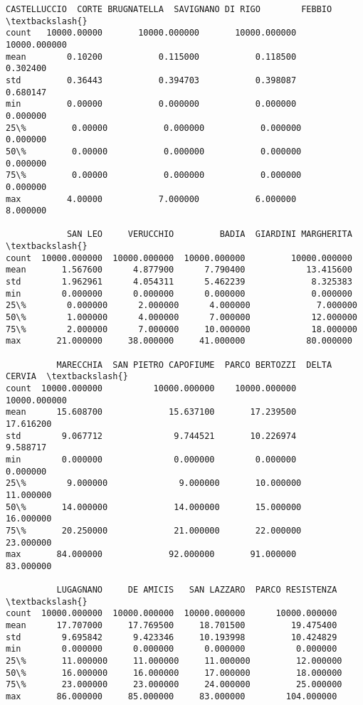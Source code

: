 \documentclass[11pt]{article}
\makeatletter
\newcommand{\boxspacing}{\kern\kvtcb@left@rule\kern\kvtcb@boxsep}
\newcommand{\prompt}[4]{
        {\ttfamily\llap{{\color{#2}[#3]:\hspace{3pt}#4}}\vspace{-\baselineskip}}
    }
\makeatother
\begin{document}
            \begin{tcolorbox}[breakable, size=fbox, boxrule=.5pt, pad at break*=1mm, opacityfill=0]
\prompt{Out}{outcolor}{22}{\boxspacing}
\begin{Verbatim}[commandchars=\\\{\}]
       CASTELLUCCIO  CORTE BRUGNATELLA  SAVIGNANO DI RIGO        FEBBIO  \textbackslash{}
count   10000.00000       10000.000000       10000.000000  10000.000000
mean        0.10200           0.115000           0.118500      0.302400
std         0.36443           0.394703           0.398087      0.680147
min         0.00000           0.000000           0.000000      0.000000
25\%         0.00000           0.000000           0.000000      0.000000
50\%         0.00000           0.000000           0.000000      0.000000
75\%         0.00000           0.000000           0.000000      0.000000
max         4.00000           7.000000           6.000000      8.000000

            SAN LEO     VERUCCHIO         BADIA  GIARDINI MARGHERITA  \textbackslash{}
count  10000.000000  10000.000000  10000.000000         10000.000000
mean       1.567600      4.877900      7.790400            13.415600
std        1.962961      4.054311      5.462239             8.325383
min        0.000000      0.000000      0.000000             0.000000
25\%        0.000000      2.000000      4.000000             7.000000
50\%        1.000000      4.000000      7.000000            12.000000
75\%        2.000000      7.000000     10.000000            18.000000
max       21.000000     38.000000     41.000000            80.000000

          MARECCHIA  SAN PIETRO CAPOFIUME  PARCO BERTOZZI  DELTA CERVIA  \textbackslash{}
count  10000.000000          10000.000000    10000.000000  10000.000000
mean      15.608700             15.637100       17.239500     17.616200
std        9.067712              9.744521       10.226974      9.588717
min        0.000000              0.000000        0.000000      0.000000
25\%        9.000000              9.000000       10.000000     11.000000
50\%       14.000000             14.000000       15.000000     16.000000
75\%       20.250000             21.000000       22.000000     23.000000
max       84.000000             92.000000       91.000000     83.000000

          LUGAGNANO     DE AMICIS   SAN LAZZARO  PARCO RESISTENZA  \textbackslash{}
count  10000.000000  10000.000000  10000.000000      10000.000000
mean      17.707000     17.769500     18.701500         19.475400
std        9.695842      9.423346     10.193998         10.424829
min        0.000000      0.000000      0.000000          0.000000
25\%       11.000000     11.000000     11.000000         12.000000
50\%       16.000000     16.000000     17.000000         18.000000
75\%       23.000000     23.000000     24.000000         25.000000
max       86.000000     85.000000     83.000000        104.000000


\end{Verbatim}
\end{tcolorbox}
\end{document}
